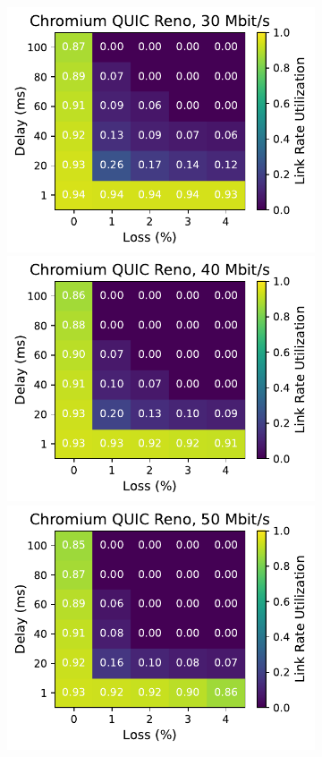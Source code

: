 \begin{figure}[ht]
\begin{subfigure}[b]{0.22\linewidth}
        \includegraphics[width=\linewidth,trim={0 0 2cm 0},clip]{figures/heatmaps/heatmap_quic_reno_30mbps.pdf}
        \includegraphics[width=\linewidth,trim={0 0 2cm 0},clip]{figures/heatmaps/heatmap_quic_reno_40mbps.pdf}
        \includegraphics[width=\linewidth,trim={0 0 2cm 0},clip]{figures/heatmaps/heatmap_quic_reno_50mbps.pdf}

\end{subfigure}
\end{figure}
